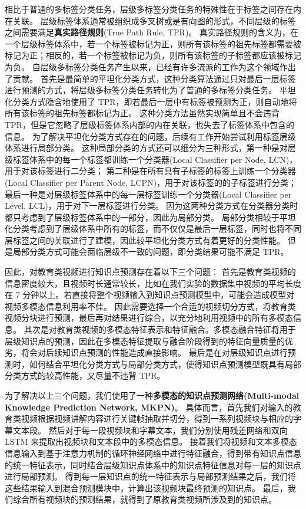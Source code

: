     相比于普通的多标签分类任务，层级多标签分类任务的特殊性在于标签之间存在内在关联。
    层级标签体系通常被组织成多叉树或是有向图的形式，不同层级的标签之间需要满足\textbf{真实路径规则}(True Path Rule, TPR)\cite{Valentini2009TruePR}。
    真实路径规则的含义为，在一个层级标签体系中，若一个标签被标记为正，则所有该标签的祖先标签都需要被标记为正；相反的，若一个标签被标记为负，则所有该标签的子标签都应该被标记为负。
    自层级多标签分类任务产生以来，已经有许多流派的工作为这个领域作出了贡献。
    首先是最简单的平坦化分类方式，这种分类算法通过只对最后一层标签\cite{Barbedo2007AutomaticGC}进行预测的方式，将层级多标签分类任务转化为了普通的多标签分类任务。
    平坦化分类方式隐含地使用了 TPR，即若最后一层中有标签被预测为正，则自动地将所有该标签的祖先标签都标记为正。
    这种分类方法虽然实现简单且不会违背 TPR，但是它忽略了层级标签体系内部的内在关联，也失去了标签体系中包含的信息。
    为了解决平坦化分类方式存在的问题，后续有工作开始尝试利用标签层级体系进行局部分类。
    这种局部分类的方式还可以细分为三种形式，第一种是对层级标签体系中的每一个标签都训练一个分类器(Local Classifier per Node, LCN)\cite{CesaBianchi2004IncrementalAF}，用于对该标签进行二分类；
    第二种是在所有具有子标签的标签上训练一个分类器(Local Classifier per Parent Node, LCPN)\cite{Secker2007AnEC}，用于对该标签的的子标签进行分类；
    最后一种是对层级标签体系中的每一层标签训练一个分类器(Local Classifier per Level, LCL)\cite{Freitas2007ATO}，用于对下一层标签进行分类。
    因为这两种分类方式在分类器分类时都只考虑到了层级标签体系中的一部分，因此为局部分类。
    局部分类相较于平坦化分类考虑到了层级体系中所有的标签，而不仅仅是最后一层标签，同时也将不同层标签之间的关联进行了建模，因此较平坦化分类方式有着更好的分类性能。
    但是局部分类方式可能会面临层级不一致的问题，即分类结果可能不满足 TPR。

    因此，对教育类视频进行知识点预测存在着以下三个问题：
    首先是教育类视频的信息密度较大，且视频时长通常较长，比如在我们实验的数据集中视频的平均长度在 7 分钟以上。若直接将整个视频输入到知识点预测模型中，可能会造成模型对视频多模态信息利用率不佳。
    因此需要选择一个合适的视频切分方式，将教育类视频分块进行预测，最后再对结果进行综合，以充分地利用视频中的所有多模态信息。
    其次是对教育类视频的多模态特征表示和特征融合。多模态融合特征将用于层级知识点的预测，因此在多模态特征提取与融合阶段得到的特征向量质量的优劣，将会对后续知识点预测的性能造成直接影响。
    最后是在对层级知识点进行预测时，如何结合平坦化分类方式与局部分类方式，使得知识点预测模型既具有局部分类方式的较高性能，又尽量不违背 TPR。

    为了解决以上三个问题，我们使用了一种\textbf{多模态的知识点预测网络(Multi-modal Knowledge Prediction Network, MKPN)}。
    具体而言，首先我们对输入的教育类视频根据视频讲解内容进行关键帧抽取并切分，得到一系列视频块与相应的字幕文本段。
    然后对于每一段视频块和字幕文本，我们分别使用残差网络和双向 LSTM 来提取出视频块和文本段中的多模态信息。
    接着我们将视频和文本多模态信息输入到基于注意力机制的循环神经网络中进行特征融合，得到带有知识点信息的统一特征表示，同时结合层级知识点体系中的知识点特征信息对每一层的知识点进行局部预测。
    得到每一层知识点的统一特征表示与局部预测结果之后，我们将这些结果输入到混合预测模块中，计算出该视频块最终预测的知识点。
    最后，我们综合所有视频块的预测结果，就得到了原教育类视频所涉及到的知识点。

